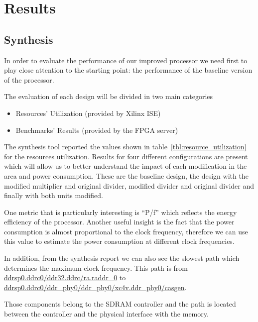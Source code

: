 \renewcommand{\kHz}{\si{\kHz}\xspace}
\renewcommand{\MHz}{\si{\MHz}\xspace}
\renewcommand{\W}{\si{\W}\xspace}
\renewcommand{\s}{\si{\s}\xspace}
\newcommand{\Oppers}{~\si[per-mode=symbol]{Op\per\s}\xspace}


\section{Results}
\label{sec:results}
\subsection{Synthesis}

In order to evaluate the performance of our improved processor we need first to play close attention to the starting point: the
performance of the baseline version of the processor.

The evaluation of each design will be divided in two main categories
\begin{itemize}
\item Resources' Utilization (provided by Xilinx ISE)
\item Benchmarks' Results (provided by the FPGA server)
\end{itemize}

The synthesis tool reported the values shown in table~\ref{tbl:resource_utilization} for the resources utilization.
Results for four different configurations are present which will allow us to better understand the impact of each modification in the area and power consumption.
These are the baseline design, the design with the modified multiplier and original divider, modified divider and original divider and finally with both units modified. 

One metric that is particularly interesting is ``P/f'' which reflects the energy efficiency of the processor. Another useful insight is the fact that the power consumption is almost proportional to the clock frequency, therefore we can use this value to estimate the power consumption at different clock frequencies.

In addition, from the synthesis report we can also see the slowest path which determines the maximum clock frequency.
This path is from \url{ddrsp0.ddrc0/ddr32.ddrc/ra.raddr_0} to \url{ddrsp0.ddrc0/ddr_phy0/ddr_phy0/xc4v.ddr_phy0/casgen}.

Those components belong to the SDRAM controller and the path is located between the controller
and the physical interface with the memory.

